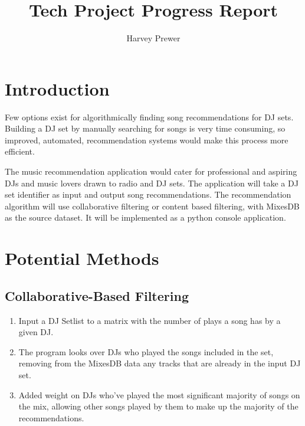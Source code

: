 \documentclass[]{article}
\title{Tech Project Progress Report}
\author{Harvey Prewer}
\begin{document}
\maketitle


\section{Introduction}
	 \begin{flushleft}
	 Few options exist for algorithmically finding song recommendations for DJ sets. Building a DJ set by manually searching for songs is very time consuming, so improved, automated, recommendation systems would make this process more efficient. 
	\end{flushleft}

\begin{flushleft}
	 The music recommendation application would cater for professional and aspiring DJs and music lovers drawn to radio and DJ sets. The application will take a DJ set identifier as input and output song recommendations. The recommendation algorithm will use collaborative filtering or content based filtering, with MixesDB as the source dataset. It will be  implemented as a python console application.
	\end{flushleft}
\section{Potential Methods}
	 \subsection{Collaborative-Based Filtering}
	 \begin{enumerate}
	 	
	 	\item  Input a DJ Setlist to a matrix with the number of plays a song has by a given DJ.
	 	\item The program looks over DJs who played the songs included in the set, removing from the MixesDB data any tracks that are already in the input DJ set.
	 	\item Added weight on DJs who've played the most significant majority of songs on the mix, allowing other songs played by them to make up the majority of the recommendations.
	 \end{enumerate}
\end{document}
